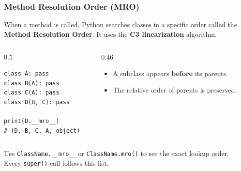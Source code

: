 \documentclass[aspectratio=169,10pt]{beamer}
\newcommand{\keyword}[1]{\textcolor{PrimaryBlue}{\textbf{#1}}}
\newcommand{\codeword}[1]{\texttt{#1}}
\begin{document}
\begin{frame}[fragile]
\frametitle{Method Resolution Order (MRO)}
\small
When a method is called, Python searches classes in a specific order called the \keyword{Method Resolution Order}. It uses the \keyword{C3 linearization} algorithm.

\vspace{0.15cm}
\begin{columns}[T,totalwidth=0.96\textwidth]
\begin{column}{0.5\textwidth}
\begin{lstlisting}[style=pycode]
class A: pass
class B(A): pass
class C(A): pass
class D(B, C): pass

print(D.__mro__)
# (D, B, C, A, object)
\end{lstlisting}
\end{column}
\begin{column}{0.46\textwidth}
\begin{tcolorbox}[lecturebox,title=Two C3 guarantees]
\begin{itemize}\setlength\itemsep{0.05cm}
  \item A subclass appears \keyword{before} its parents.
  \item The relative order of parents is preserved.
\end{itemize}
\end{tcolorbox}
\end{column}
\end{columns}

\vspace{0.15cm}
\begin{tcolorbox}[lecturebox,title=Inspecting the MRO]
Use \codeword{ClassName.\_\_mro\_\_} or \codeword{ClassName.mro()} to see the exact lookup order. Every \codeword{super()} call follows this list.
\end{tcolorbox}
\end{frame}
\end{document}
